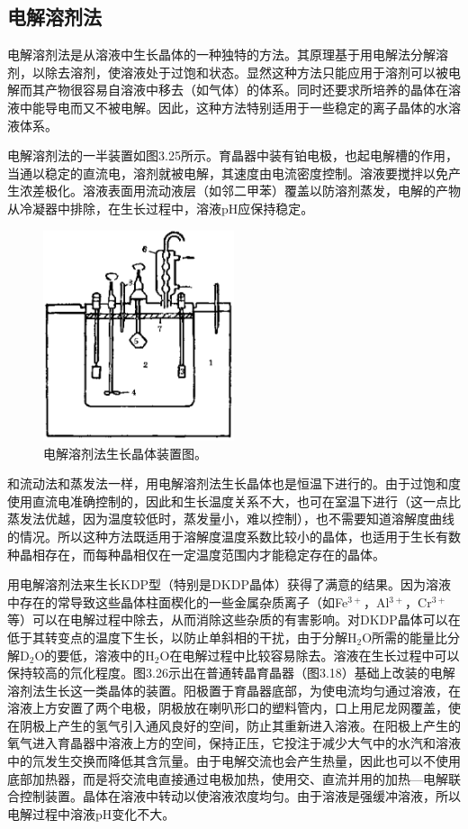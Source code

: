 ﻿\subsection{电解溶剂法}
电解溶剂法是从溶液中生长晶体的一种独特的方法。其原理基于用电解法分解溶剂，以除去溶剂，使溶液处于过饱和状态。显然这种方法只能应用于溶剂可以被电解而其产物很容易自溶液中移去（如气体）的体系。同时还要求所培养的晶体在溶液中能导电而又不被电解。因此，这种方法特别适用于一些稳定的离子晶体的水溶液体系。

电解溶剂法的一半装置如图3.25所示。育晶器中装有铂电极，也起电解槽的作用，当通以稳定的直流电，溶剂就被电解，其速度由电流密度控制。溶液要搅拌以免产生浓差极化。溶液表面用流动液层（如邻二甲苯）覆盖以防溶剂蒸发，电解的产物从冷凝器中排除，在生长过程中，溶液pH应保持稳定。

\begin{figure}[h]
 \centering
 \includegraphics[width=0.5\textwidth]{fig/cp03/img3.25.jpg}
 \caption{电解溶剂法生长晶体装置图。}
\end{figure}

和流动法和蒸发法一样，用电解溶剂法生长晶体也是恒温下进行的。由于过饱和度使用直流电准确控制的，因此和生长温度关系不大，也可在室温下进行（这一点比蒸发法优越，因为温度较低时，蒸发量小，难以控制），也不需要知道溶解度曲线的情况。所以这种方法既适用于溶解度温度系数比较小的晶体，也适用于生长有数种晶相存在，而每种晶相仅在一定温度范围内才能稳定存在的晶体。

用电解溶剂法来生长KDP型（特别是DKDP晶体）获得了满意的结果。因为溶液中存在的常导致这些晶体柱面楔化的一些金属杂质离子（如Fe$^{3+}$，Al$^{3+}$，Cr$^{3+}$等）可以在电解过程中除去，从而消除这些杂质的有害影响。对DKDP晶体可以在低于其转变点的温度下生长，以防止单斜相的干扰，由于分解H$_2$O所需的能量比分解D$_2$O的要低，溶液中的H$_2$O在电解过程中比较容易除去。溶液在生长过程中可以保持较高的氘化程度。图3.26示出在普通转晶育晶器（图3.18）基础上改装的电解溶剂法生长这一类晶体的装置。阳极置于育晶器底部，为使电流均匀通过溶液，在溶液上方安置了两个电极，阴极放在喇叭形口的塑料管内，口上用尼龙网覆盖，使在阴极上产生的氢气引入通风良好的空间，防止其重新进入溶液。在阳极上产生的氧气进入育晶器中溶液上方的空间，保持正压，它投注于减少大气中的水汽和溶液中的氘发生交换而降低其含氘量。由于电解交流也会产生热量，因此也可以不使用底部加热器，而是将交流电直接通过电极加热，使用交、直流并用的加热—电解联合控制装置。晶体在溶液中转动以使溶液浓度均匀。由于溶液是强缓冲溶液，所以电解过程中溶液pH变化不大。

